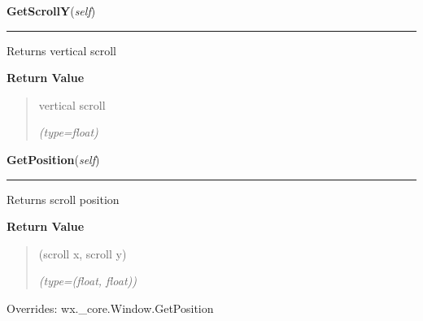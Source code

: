     \vspace{0.5ex}

\hspace{.8\funcindent}\begin{boxedminipage}{\funcwidth}

    \raggedright \textbf{GetScrollY}(\textit{self})

    \vspace{-1.5ex}

    \rule{\textwidth}{0.5\fboxrule}
\setlength{\parskip}{2ex}
    Returns vertical scroll

\setlength{\parskip}{1ex}
      \textbf{Return Value}
    \vspace{-1ex}

      \begin{quote}
      vertical scroll

      {\it (type=float)}

      \end{quote}

    \end{boxedminipage}

    \vspace{0.5ex}

\hspace{.8\funcindent}\begin{boxedminipage}{\funcwidth}

    \raggedright \textbf{GetPosition}(\textit{self})

    \vspace{-1.5ex}

    \rule{\textwidth}{0.5\fboxrule}
\setlength{\parskip}{2ex}
    Returns scroll position

\setlength{\parskip}{1ex}
      \textbf{Return Value}
    \vspace{-1ex}

      \begin{quote}
      (scroll x, scroll y)

      {\it (type=(float, float))}

      \end{quote}

      Overrides: wx.\_core.Window.GetPosition

    \end{boxedminipage}

    \label{ImagePanel:ImagePanel:SetImage}


